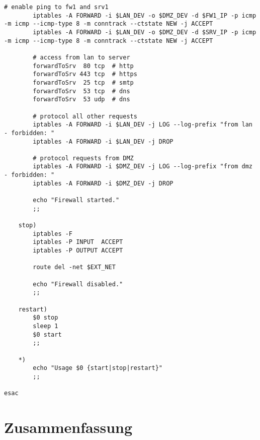 \begin{lstlisting}[label=lst:masq,caption={Basisskript interne Firewall.}]
        # enable ping to fw1 and srv1
        iptables -A FORWARD -i $LAN_DEV -o $DMZ_DEV -d $FW1_IP -p icmp -m icmp --icmp-type 8 -m conntrack --ctstate NEW -j ACCEPT
        iptables -A FORWARD -i $LAN_DEV -o $DMZ_DEV -d $SRV_IP -p icmp -m icmp --icmp-type 8 -m conntrack --ctstate NEW -j ACCEPT

        # access from lan to server
        forwardToSrv  80 tcp  # http
        forwardToSrv 443 tcp  # https
        forwardToSrv  25 tcp  # smtp
        forwardToSrv  53 tcp  # dns
        forwardToSrv  53 udp  # dns

        # protocol all other requests
        iptables -A FORWARD -i $LAN_DEV -j LOG --log-prefix "from lan - forbidden: "
        iptables -A FORWARD -i $LAN_DEV -j DROP

        # protocol requests from DMZ
        iptables -A FORWARD -i $DMZ_DEV -j LOG --log-prefix "from dmz - forbidden: "
        iptables -A FORWARD -i $DMZ_DEV -j DROP

        echo "Firewall started."
        ;;

    stop)
        iptables -F
        iptables -P INPUT  ACCEPT
        iptables -P OUTPUT ACCEPT

        route del -net $EXT_NET

        echo "Firewall disabled."
        ;;

    restart)
        $0 stop
        sleep 1
        $0 start
        ;;

    *)
        echo "Usage $0 {start|stop|restart}"
        ;;

esac
\end{lstlisting}
\section{Zusammenfassung}
